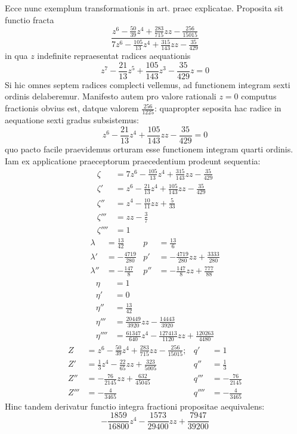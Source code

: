 Ecce nunc exemplum transformationis in art. praec explicatae. Proposita sit functio fracta
\[
\frac{z^6-\frac{50}{39}z^4+\frac{283}{715}zz-\frac{256}{15015}}{7z^6-\frac{105}{13}z^4+\frac{315}{143}zz-\frac{35}{429}}
\]
in qua $z$ indefinite repraesentat radices aequationis
\[
z^7-\frac{21}{13}z^5+\frac{105}{143}z^3-\frac{35}{429}z=0
\]
Si hic omnes septem radices complecti vellemus, ad functionem integram sexti ordinis delaberemur. Manifesto autem pro valore rationali $z=0$ computus fractionis obvius est, datque valorem $\frac{256}{1225}$: quapropter seposita hac radice in aequatione sexti gradus subsistemus:
\[
z^6-\frac{21}{13}z^4+\frac{105}{143}zz-\frac{35}{429}=0
\]
quo pacto facile praevidemus orturam esse functionem integram quarti ordinis. Iam ex applicatione praeceptorum praecedentium prodeunt sequentia:
\[
\begin{aligned}
\zeta&=7z^6-\frac{105}{13}z^4+\frac{315}{143}zz-\frac{35}{429}\\[5pt]
\zeta'&=z^6-\frac{21}{13}z^4+\frac{105}{143}zz-\frac{35}{429}\\[5pt]
\zeta''&=z^4-\frac{10}{11}zz+\frac{5}{33}\\[5pt]
\zeta'''&=zz-\frac{3}{7}\\[5pt]
\zeta''''&=1
\end{aligned}\]
\[\begin{aligned}
\lambda&=\frac{13}{42}&p&=\frac{13}{6}\\[5pt]
\lambda'&=-\frac{4719}{280}&p'&=-\frac{4719}{280}zz+\frac{3333}{280}\\[5pt]
\lambda''&=-\frac{147}{8}&p''&=-\frac{147}{8}zz+\frac{777}{88}
\end{aligned}\]
\[\begin{aligned}
\eta&=1\\[5pt]
\eta'&=0\\[5pt]
\eta''&=\frac{13}{42}\\[5pt]
\eta'''&=\frac{20449}{3920}zz-\frac{14443}{3920}\\[5pt]
\eta''''&=\frac{61347}{640}z^4-\frac{127413}{1120}zz+\frac{120263}{4480}
\end{aligned}\]
\[\begin{aligned}
Z&=z^6-\frac{50}{39}z^4+\frac{283}{715}zz-\frac{256}{15015};&q'&=1\\[5pt]
Z'&=\frac{1}{3}z^4-\frac{22}{65}zz+\frac{323}{5005}&q''&=\frac{1}{3}\\[5pt]
Z''&=-\frac{76}{2145}zz+\frac{632}{45045}&q'''&=-\frac{76}{2145}\\[5pt]
Z'''&=-\frac{4}{3465}&q''''&=-\frac{4}{3465}
\end{aligned}
\]
Hinc tandem derivatur functio integra fractioni propositae aequivalens:
\[
-\frac{1859}{16800}z^4-\frac{1573}{29400}zz+\frac{7947}{39200}
\]

